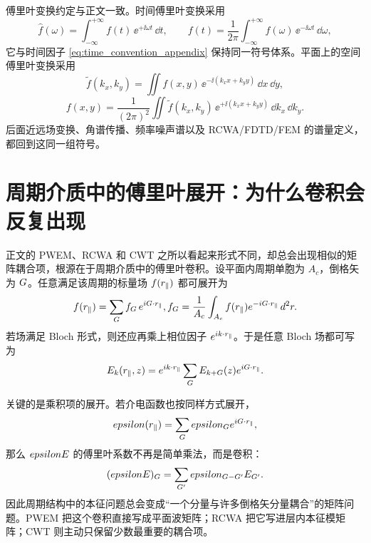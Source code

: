 傅里叶变换约定与正文一致。时间傅里叶变换采用
\begin{equation}
\hat f(\omega)
=
\int_{-\infty}^{+\infty} f(t)\,\ee^{+\ii\omega t}\,\dd t,
\qquad
f(t)
=
\frac{1}{2\pi}\int_{-\infty}^{+\infty}\hat f(\omega)\,\ee^{-\ii\omega t}\,\dd\omega,
\label{eq:temporal_ft_convention}
\end{equation}
它与时间因子 \cref{eq:time_convention_appendix} 保持同一符号体系。平面上的空间傅里叶变换采用
\begin{equation}
\tilde f(k_x,k_y)
=
\iint f(x,y)\,\ee^{-\ii(k_x x+k_y y)}\,\dd x\,\dd y,
\label{eq:spatial_ft_forward}
\end{equation}
\begin{equation}
f(x,y)
=
\frac{1}{(2\pi)^2}
\iint \tilde f(k_x,k_y)\,\ee^{+\ii(k_x x+k_y y)}\,\dd k_x\,\dd k_y.
\label{eq:spatial_ft_inverse}
\end{equation}
后面近远场变换、角谱传播、频率噪声谱以及 RCWA/FDTD/FEM 的谱量定义，都回到这同一组符号。

\section{周期介质中的傅里叶展开：为什么卷积会反复出现}
正文的 PWEM、RCWA 和 CWT 之所以看起来形式不同，却总会出现相似的矩阵耦合项，根源在于周期介质中的傅里叶卷积。设平面内周期单胞为 $A_c$，倒格矢为 $G$。任意满足该周期的标量场 $f(r_\parallel)$ 都可展开为
\begin{equation}
f(\rvec_\parallel)=\sum_{\gvec} f_{\gvec}\,\ee^{\ii\gvec\cdot\rvec_\parallel},
\qquad
f_{\gvec}=\frac{1}{A_c}\int_{A_c} f(\rvec_\parallel)\ee^{-\ii\gvec\cdot\rvec_\parallel}\,\dd^2r.
\label{eq:fourier_periodic_appendix}
\end{equation}
若场满足 Bloch 形式，则还应再乘上相位因子 $e^{ik\cdot r_\parallel}$。于是任意 Bloch 场都可写为
\begin{equation}
E_{k}(r_\parallel,z)
=
e^{ik\cdot r_\parallel}
\sum_{G}
E_{k+G}(z)
e^{iG\cdot r_\parallel}.
\label{eq:bloch_fourier_appendix}
\end{equation}

关键的是乘积项的展开。若介电函数也按同样方式展开，
\begin{equation}
epsilon(r_\parallel)
=
\sum_{G}
epsilon_{G}
e^{iG\cdot r_\parallel},
\end{equation}
那么 $epsilonE$ 的傅里叶系数不再是简单乘法，而是卷积：
\begin{equation}
(epsilon E)_{G}
=
\sum_{G'} epsilon_{G-G'} E_{G'}.
\label{eq:convolution_appendix}
\end{equation}
因此周期结构中的本征问题总会变成“一个分量与许多倒格矢分量耦合”的矩阵问题。PWEM 把这个卷积直接写成平面波矩阵；RCWA 把它写进层内本征模矩阵；CWT 则主动只保留少数最重要的耦合项。


